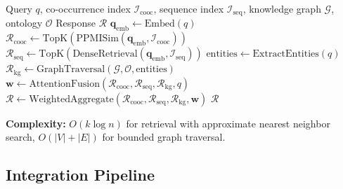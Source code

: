 \documentclass[conference]{IEEEtran}
\begin{document}
\begin{algorithm}
\caption{Hybrid Memory Query Processing}
\begin{algorithmic}[1]
\REQUIRE Query $q$, co-occurrence index $\mathcal{I}_{\text{cooc}}$, sequence index $\mathcal{I}_{\text{seq}}$, knowledge graph $\mathcal{G}$, ontology $\mathcal{O}$
\ENSURE Response $\mathcal{R}$
\STATE $\mathbf{q}_{\text{emb}} \leftarrow \text{Embed}(q)$
\STATE {}
\STATE $\mathcal{R}_{\text{cooc}} \leftarrow \text{TopK}(\text{PPMISim}(\mathbf{q}_{\text{emb}}, \mathcal{I}_{\text{cooc}}))$
\STATE {}
\STATE $\mathcal{R}_{\text{seq}} \leftarrow \text{TopK}(\text{DenseRetrieval}(\mathbf{q}_{\text{emb}}, \mathcal{I}_{\text{seq}}))$
\STATE {}
\STATE $\text{entities} \leftarrow \text{ExtractEntities}(q)$
\STATE $\mathcal{R}_{\text{kg}} \leftarrow \text{GraphTraversal}(\mathcal{G}, \mathcal{O}, \text{entities})$
\STATE {}
\STATE $\mathbf{w} \leftarrow \text{AttentionFusion}(\mathcal{R}_{\text{cooc}}, \mathcal{R}_{\text{seq}}, \mathcal{R}_{\text{kg}}, q)$
\STATE $\mathcal{R} \leftarrow \text{WeightedAggregate}(\mathcal{R}_{\text{cooc}}, \mathcal{R}_{\text{seq}}, \mathcal{R}_{\text{kg}}, \mathbf{w})$
\RETURN $\mathcal{R}$
\end{algorithmic}
\end{algorithm}

\textbf{Complexity:} $O(k \log n)$ for retrieval with approximate nearest neighbor search, $O(|V| + |E|)$ for bounded graph traversal.

\subsection{Integration Pipeline}
\end{document}
